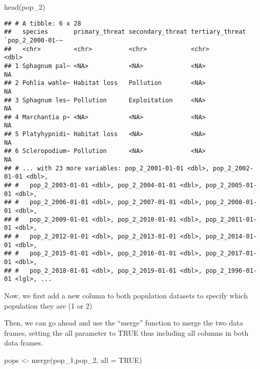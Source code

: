 \documentclass[
]{article}
\newenvironment{Shaded}{\begin{snugshade}}{\end{snugshade}}
\newcommand{\AttributeTok}[1]{\textcolor[rgb]{0.77,0.63,0.00}{#1}}
\newcommand{\ConstantTok}[1]{\textcolor[rgb]{0.00,0.00,0.00}{#1}}
\newcommand{\DecValTok}[1]{\textcolor[rgb]{0.00,0.00,0.81}{#1}}
\newcommand{\FunctionTok}[1]{\textcolor[rgb]{0.00,0.00,0.00}{#1}}
\newcommand{\NormalTok}[1]{#1}
\newcommand{\OtherTok}[1]{\textcolor[rgb]{0.56,0.35,0.01}{#1}}
\newcommand{\SpecialCharTok}[1]{\textcolor[rgb]{0.00,0.00,0.00}{#1}}
\begin{document}
\begin{Shaded}
\begin{Highlighting}[]
\FunctionTok{head}\NormalTok{(pop\_2)}
\end{Highlighting}
\end{Shaded}

\begin{verbatim}
## # A tibble: 6 x 28
##   species       primary_threat secondary_threat tertiary_threat `pop_2_2000-01-~
##   <chr>         <chr>          <chr>            <chr>                      <dbl>
## 1 Sphagnum pal~ <NA>           <NA>             <NA>                          NA
## 2 Pohlia wahle~ Habitat loss   Pollution        <NA>                          NA
## 3 Sphagnum les~ Pollution      Exploitation     <NA>                          NA
## 4 Marchantia p~ <NA>           <NA>             <NA>                          NA
## 5 Platyhypnidi~ Habitat loss   <NA>             <NA>                          NA
## 6 Scleropodium~ Pollution      <NA>             <NA>                          NA
## # ... with 23 more variables: pop_2_2001-01-01 <dbl>, pop_2_2002-01-01 <dbl>,
## #   pop_2_2003-01-01 <dbl>, pop_2_2004-01-01 <dbl>, pop_2_2005-01-01 <dbl>,
## #   pop_2_2006-01-01 <dbl>, pop_2_2007-01-01 <dbl>, pop_2_2008-01-01 <dbl>,
## #   pop_2_2009-01-01 <dbl>, pop_2_2010-01-01 <dbl>, pop_2_2011-01-01 <dbl>,
## #   pop_2_2012-01-01 <dbl>, pop_2_2013-01-01 <dbl>, pop_2_2014-01-01 <dbl>,
## #   pop_2_2015-01-01 <dbl>, pop_2_2016-01-01 <dbl>, pop_2_2017-01-01 <dbl>,
## #   pop_2_2018-01-01 <dbl>, pop_2_2019-01-01 <dbl>, pop_2_1996-01-01 <lgl>, ...
\end{verbatim}

Now, we first add a new column to both population datasets to specify
which population they are (1 or 2)

\begin{Shaded}
\end{Shaded}

Then, we can go ahead and use the ``merge'' function to merge the two
data frames, setting the all parameter to TRUE thus including all
columns in both data frames.

\begin{Shaded}
\begin{Highlighting}[]
\NormalTok{pops }\OtherTok{\textless{}{-}} \FunctionTok{merge}\NormalTok{(pop\_1,pop\_2, }\AttributeTok{all =} \ConstantTok{TRUE}\NormalTok{)}
\end{Highlighting}
\end{Shaded}
\end{document}
